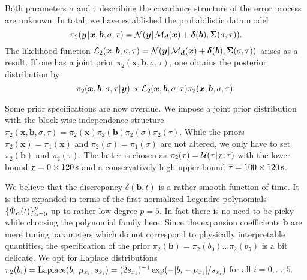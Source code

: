 Both parameters \(\sigma\) and \(\tau\) describing the covariance structure of the error process are unknown.
In total, we have established the probabilistic data model
\begin{equation} \label{eq:Hydro:Discrepancy:RandomData}
  \pi_2(\bm{y} {\:\!}|{\:\!} \bm{x},\bm{b},\sigma,\tau) = \mathcal{N}(\bm{y} {\:\!}|{\:\!} \mathcal{M}_{\bm{d}}(\bm{x}) + \bm{\delta}(\bm{b}), \bm{\Sigma}(\sigma,\tau)).
\end{equation}
The likelihood function \(\mathcal{L}_2(\bm{x},\bm{b},\sigma,\tau) = \mathcal{N}(\bm{y} {\:\!}|{\:\!} \mathcal{M}_{\bm{d}}(\bm{x}) + \bm{\delta}(\bm{b}), \bm{\Sigma}(\sigma,\tau))\) arises as a result.
If one has a joint prior \(\pi_2(\bm{x},\bm{b},\sigma,\tau)\), one obtains the posterior distribution by
\begin{equation} \label{eq:Hydro:Discrepancy:Posterior}
  \pi_2(\bm{x},\bm{b},\sigma,\tau {\:\!}|{\:\!} \bm{y}) \propto \mathcal{L}_2(\bm{x},\bm{b},\sigma,\tau) \pi_2(\bm{x},\bm{b},\sigma,\tau).
\end{equation}
\par %
Some prior specifications are now overdue.
We impose a joint prior distribution with the block-wise independence structure \(\pi_2(\bm{x},\bm{b},\sigma,\tau) = \pi_2(\bm{x}) \pi_2(\bm{b}) \pi_2(\sigma) \pi_2(\tau)\).
While the priors \(\pi_2(\bm{x}) = \pi_1(\bm{x})\) and \(\pi_2(\sigma) = \pi_1(\sigma)\) are not altered, we only have to set \(\pi_2(\bm{b})\) and \(\pi_2(\tau)\).
The latter is chosen as \(\pi_2(\tau) = \mathcal{U}(\tau {\:\!}|{\:\!} \underline{\tau},\overline{\tau})\) with the lower bound
\(\underline{\tau} = 0 \times \unit[120]{s}\) and a conservatively high upper bound \(\overline{\tau} = 100 \times \unit[120]{s}\).
\par %
We believe that the discrepancy \(\delta(\bm{b},t)\) is a rather smooth function of time.
It is thus expanded in terms of the first normalized Legendre polynomials \(\{\Psi_\alpha(t)\}_{\alpha=0}^p\) up to rather low degree \(p = 5\).
In fact there is no need to be picky while choosing the polynomial family here.
Since the expansion coefficients \(\bm{b}\) are mere tuning parameters which do not correspond to physically interpretable quantities,
the specification of the prior \(\pi_2(\bm{b}) = \pi_2(b_0) \ldots \pi_2(b_5)\) is a bit delicate.
We opt for Laplace distributions \(\pi_2(b_i) = \mathrm{Laplace}(b_i {\:\!}|{\:\!} \mu_{x_i},s_{x_i}) = (2s_{x_i})^{-1} \exp( - \lvert b_i - \mu_{x_i} \rvert / s_{x_i})\) for all \(i=0,\ldots,5\).
